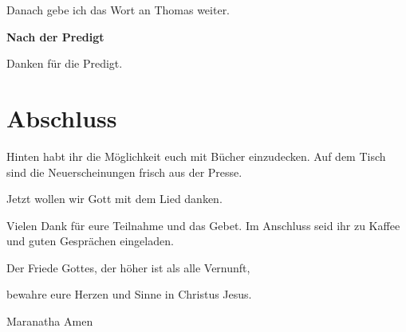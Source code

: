 Danach gebe ich das Wort an Thomas weiter.

\textbf{Nach der Predigt}

Danken für die Predigt.


\section{Abschluss}
Hinten habt ihr die Möglichkeit euch mit Bücher einzudecken. Auf dem Tisch sind die Neuerscheinungen frisch aus der Presse.


Jetzt wollen wir Gott mit dem Lied  danken.


Vielen Dank für eure Teilnahme und das Gebet. Im Anschluss seid ihr zu Kaffee und guten Gesprächen eingeladen.
\beten{} 


Der Friede Gottes, der höher ist als alle Vernunft,

bewahre eure Herzen und Sinne in Christus Jesus.

Maranatha Amen

